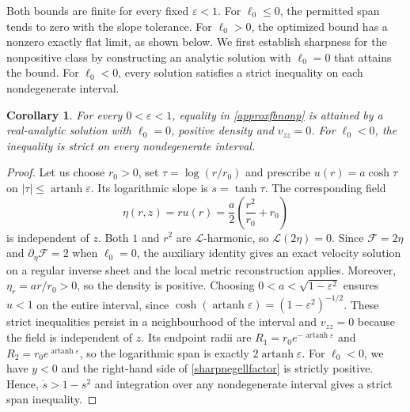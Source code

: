 \documentclass[amsmath,amsfonts,amssymb,aps,pra,superscriptaddress,10pt]{revtex4-2}
\numberwithin{equation}{section}
\theoremstyle{plain}
\newtheorem{corollary}{Corollary}
\theoremstyle{definition}
\theoremstyle{remark}
\theoremstyle{definition}
\newcommand{\ellzero}{\ell_0}
\begin{document}
Both bounds are finite for every fixed $\varepsilon<1$. For $\ellzero\leq 0$, the permitted span tends to zero with the slope tolerance. For $\ellzero>0$, the optimized bound has a nonzero exactly flat limit, as shown below. We first establish sharpness for the nonpositive class by constructing an analytic solution with $\ellzero=0$ that attains the bound. For $\ellzero<0$, every solution satisfies a strict inequality on each nondegenerate interval.

\begin{corollary}
For every $0<\varepsilon<1$, equality in \eqref{approxfbnonp} is attained by a real-analytic solution with $\ellzero=0$, positive density and $v_{zz}=0$. For $\ellzero<0$, the inequality is strict on every nondegenerate interval.
\end{corollary}

\begin{proof}
Let us choose $r_0>0$, set $\tau=\log{(r/r_0)}$ and prescribe $u(r)=a\cosh{\tau}$ on $|\tau|\leq\operatorname{artanh}{\varepsilon}$. Its logarithmic slope is $s=\tanh{\tau}$. The corresponding field
\begin{equation}
\eta(r,z)=ru(r)=\frac{a}{2}\left(\frac{r^2}{r_0}+r_0\right)
\end{equation}
is independent of $z$. Both $1$ and $r^2$ are $\mathcal{L}$-harmonic, so $\mathcal{L}(2\eta)=0$. Since $\mathcal{F}=2\eta$ and $\partial_\eta\mathcal{F}=2$ when $\ellzero=0$, the auxiliary identity gives an exact velocity solution on a regular inverse sheet and the local metric reconstruction applies. Moreover, $\eta_r=ar/r_0>0$, so the density is positive. Choosing $0<a<\sqrt{1-\varepsilon^2}$ ensures $u<1$ on the entire interval, since $\cosh{(\operatorname{artanh}{\varepsilon})}=(1-\varepsilon^2)^{-1/2}$. These strict inequalities persist in a neighbourhood of the interval and $v_{zz}=0$ because the field is independent of $z$. Its endpoint radii are $R_1=r_0e^{-\operatorname{artanh}{\varepsilon}}$ and $R_2=r_0e^{\operatorname{artanh}{\varepsilon}}$, so the logarithmic span is exactly $2\operatorname{artanh}{\varepsilon}$. For $\ellzero<0$, we have $y<0$  and the right-hand side of \eqref{sharpnegellfactor} is strictly positive. Hence, $\dot{s}>1-s^2$ and integration over any nondegenerate interval gives a strict span inequality.
\end{proof}
\end{document}
